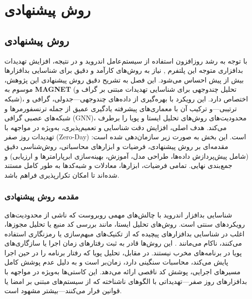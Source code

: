 \clearpage
\thispagestyle{empty}
\chapter{روش پیشنهادی}\label{chap3}

\section{روش پیشنهادی}

با توجه به رشد روزافزون استفاده از سیستم‌عامل اندروید  و در نتیجه، افزایش تهدیدات بدافزاری متوجه این پلتفرم \cite{AndroidSecurity}, نیاز به روش‌های کارآمد و دقیق برای شناسایی بدافزارها بیش از پیش احساس می‌شود. این فصل به تشریح دقیق روش پیشنهادی این پژوهش، موسوم به \textbf{MAGNET} (تحلیل چندوجهی برای شناسایی تهدیدات مبتنی بر گراف و شبکه)، اختصاص دارد. این رویکرد با بهره‌گیری از داده‌های چندوجهی—جدولی، گرافی و ترتیبی—و ترکیب آن با معماری‌های پیشرفته یادگیری عمیق از جمله ترنسفورمرها و شبکه‌های عصبی گرافی (GNN)، محدودیت‌های روش‌های تحلیل ایستا و پویا را برطرف می‌کند. هدف اصلی، افزایش دقت شناسایی و تعمیم‌پذیری، به‌ویژه در مواجهه با تهدیدات روز صفر (Zero-Day) است. این بخش به صورت زیر سازمان‌دهی شده است: مقدمه‌ای بر روش پیشنهادی، فرضیات و ابزارهای محاسباتی، روش‌شناسی دقیق (شامل پیش‌پردازش داده‌ها، طراحی مدل، آموزش، بهینه‌سازی ابرپارامترها و ارزیابی) و جمع‌بندی نهایی. تمامی فرضیات، ابزارها، معادلات و شبه‌کدها به طور کامل مستند شده‌اند تا امکان تکرارپذیری فراهم باشد.

\subsection{مقدمه روش پیشنهادی}

شناسایی بدافزار اندروید با چالش‌های مهمی روبروست که ناشی از محدودیت‌های رویکردهای سنتی است. روش‌های تحلیل ایستا، مانند بررسی کد منبع یا تحلیل مجوزها، اغلب در شناسایی بدافزارهای پیچیده که از تکنیک‌های مبهم‌سازی یا رمزنگاری استفاده می‌کنند، ناکام می‌مانند \cite{Drebin}. این روش‌ها قادر به ثبت رفتارهای زمان اجرا یا سازگاری‌های پویا در برنامه‌های مخرب نیستند. در مقابل، تحلیل پویا که رفتار برنامه را در حین اجرا پایش می‌کند، محاسبات سنگینی دارد، زمان‌بر است و به دلیل عدم پوشش کامل مسیرهای اجرایی، پوشش کد ناقصی ارائه می‌دهد. این کاستی‌ها به‌ویژه در مواجهه با بدافزارهای روز صفر—تهدیداتی با الگوهای ناشناخته که از سیستم‌های مبتنی بر امضا یا قوانین فرار می‌کنند—بیشتر مشهود است.

